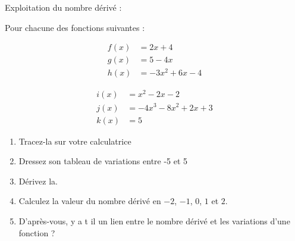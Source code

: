 Exploitation du nombre dérivé :

Pour chacune des fonctions suivantes :

\begin{multicols}{2}
	
	\begin{align}
	f(x) &= 2x+4 \\
	g(x) &= 5-4x \\
	h(x) &= -3x^2+6x-4
	\end{align}
	
	\begin{align}
	i(x) &= x^2-2x-2\\
	j(x) &= -4x^3-8x^2+2x+3\\
	k(x) &= 5
	\end{align}

\end{multicols}

\begin{enumerate}
	\item Tracez-la sur votre calculatrice
	\item Dressez son tableau de variations entre -5 et 5
	\item Dérivez la.
	\item Calculez la valeur du nombre dérivé en $-2$, $-1$, $0$, $1$ et $2$.
	\item D'après-vous, y a t il un lien entre le nombre dérivé et les variations d'une fonction ?
\end{enumerate}
